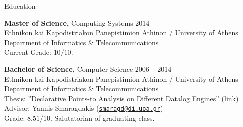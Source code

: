 \documentclass{resume}
\begin{document}
\newcommand{\mytilde}{\raise.17ex\hbox{$\scriptstyle\mathtt{\sim}$}}
\newcommand{\indentitem}{\setlength\itemindent{25pt}}


\begin{rSection}{Education}

{\bf Master of Science,} Computing Systems \hfill {2014 -- } \\
Ethnikon kai Kapodistriakon Panepistimion Athinon / University of Athens \\
Department of Informatics \& Telecommunications \\
Current Grade: $10 / 10$.

{\bf Bachelor of Science,} Computer Science \hfill {2006 -- 2014}  \\
Ethnikon kai Kapodistriakon Panepistimion Athinon / University of Athens \\
Department of Informatics \& Telecommunications \\
Thesis: ''Declarative Points-to Analysis on Different Datalog Engines'' \href{http://cgi.di.uoa.gr/~smaragd/theses/antoniadis.pdf}{ (link)} \\
Advisor: Yannis Smaragdakis 
  (\href{mailto:smaragd@di.uoa.gr}{\nolinkurl{smaragd@di.uoa.gr}}) \\
Grade: $8.51 / 10$. Salutatorian of graduating class. %

\end{rSection}

\end{document}
